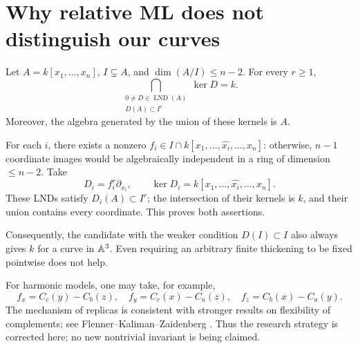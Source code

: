 \section{Why relative ML does not distinguish our curves}\label{sec:relativeML}
Let $A=k[x_1,\ldots,x_n]$, $I\subsetneq A$, and $\dim(A/I)\le n-2$. For every $r\ge1$,
\[
\boxed{\bigcap_{\substack{0\ne D\in\operatorname{LND}(A)\\D(A)\subset I^r}}\ker D=k.}
\]
Moreover, the algebra generated by the union of these kernels is $A$.

For each $i$, there exists a nonzero $f_i\in I\cap k[x_1,\ldots,\widehat{x_i},\ldots,x_n]$: otherwise, $n-1$ coordinate images would be algebraically independent in a ring of dimension $\le n-2$. Take
\[
D_i=f_i^r\partial_{x_i},\qquad
\ker D_i=k[x_1,\ldots,\widehat{x_i},\ldots,x_n].
\]
These LNDs satisfy $D_i(A)\subset I^r$; the intersection of their kernels is $k$, and their union contains every coordinate. This proves both assertions.

Consequently, the candidate with the weaker condition $D(I)\subset I$ also always gives $k$ for a curve in ${\mathbb{A}}^3$. Even requiring an arbitrary finite thickening to be fixed pointwise does not help.

For harmonic models, one may take, for example,
\[
f_x=C_c(y)-C_b(z),\quad
f_y=C_c(x)-C_a(z),\quad
f_z=C_b(x)-C_a(y).
\]
The mechanism of replicas is consistent with stronger results on flexibility of complements; see Flenner--Kaliman--Zaidenberg \cite{FKZ}. Thus the research strategy is corrected here; no new nontrivial invariant is being claimed.
